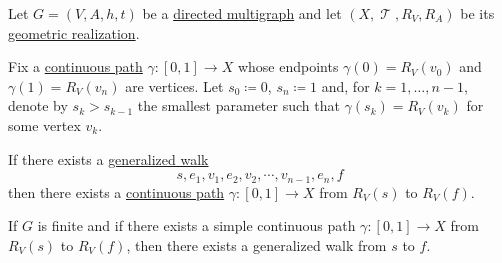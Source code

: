 \begin{proposition}\label{thm:directed_multigraph_geometric_realization_paths}
  Let \( G = (V, A, h, t) \) be a \hyperref[def:directed_multigraph]{directed multigraph} and let \( (X, \mscrT, R_V, R_A) \) be its \hyperref[def:graph_geometric_realization]{geometric realization}.

  Fix a \hyperref[def:parametric_curve]{continuous path} \( \gamma: [0, 1] \to X \) whose endpoints \( \gamma(0) = R_V(v_0) \) and \( \gamma(1) = R_V(v_n) \) are vertices. Let \( s_0 \coloneqq 0 \), \( s_n \coloneqq 1 \) and, for \( k = 1, \ldots, n - 1 \), denote by \( s_k > s_{k-1} \) the smallest parameter such that \( \gamma(s_k) = R_V(v_k) \) for some vertex \( v_k \).

  \begin{thmenum}
     If there exists a \hyperref[def:graph_walk/generalized]{generalized walk}
    \begin{equation}\label{eq:thm:directed_multigraph_geometric_realization_paths/graph_to_realization/graph}
      s, e_1, v_1, e_2, v_2, \cdots, v_{n-1}, e_n, f
    \end{equation}
    then there exists a \hyperref[def:parametric_curve]{continuous path} \( \gamma: [0, 1] \to X \) from \( R_V(s) \) to \( R_V(f) \).

     If \( G \) is finite and if there exists a simple continuous path \( \gamma: [0, 1] \to X \) from \( R_V(s) \) to \( R_V(f) \), then there exists a generalized walk from \( s \) to \( f \).
  \end{thmenum}
\end{proposition}

